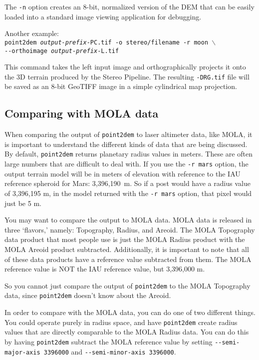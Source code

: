 The {\tt -n} option creates an 8-bit, normalized version of the DEM
that can be easily loaded into a standard image viewing application
for debugging.

Another example: \\
\hspace*{2em}\texttt{point2dem \textit{output-prefix}-PC.tif -o stereo/filename -r moon $\backslash$} \\
\hspace*{4em}\texttt{-\/-orthoimage \textit{output-prefix}-L.tif}

This command takes the left input image and orthographically projects
it onto the 3D terrain produced by the Stereo Pipeline.  The resulting
{\tt *-DRG.tif} file will be saved as an 8-bit GeoTIFF image in a
simple cylindrical map projection.

\subsection{Comparing with MOLA data}

When comparing the output of \texttt{point2dem} to laser altimeter
data, like MOLA, it is important to understand the different kinds
of data that are being discussed.  By default, \texttt{point2dem}
returns planetary radius values in meters.  These are often large
numbers that are difficult to deal with.  If you use the \texttt{-r
mars} option, the output terrain model will be in meters of elevation
with reference to the IAU reference spheroid for Mars: 3,396,190~m.
So if a post would have a radius value of 3,396,195 m, in the model
returned with the \texttt{-r mars} option, that pixel would just be 5 m.

You may want to compare the output to MOLA data.  MOLA data is
released in three `flavors,' namely: Topography, Radius, and Areoid.
The MOLA Topography data product that most people use is just the MOLA Radius
product with the MOLA Areoid product subtracted.  Additionally, it is
important to note that all of these data products have a reference
value subtracted from them.  The MOLA reference value is NOT the
IAU reference value, but 3,396,000 m.

So you cannot just compare the output of \texttt{point2dem}
to the MOLA Topography data, since \texttt{point2dem} doesn't know about the Areoid.

In order to compare with the MOLA data, you can do one of two
different things.  You could operate purely in radius space, and
have \texttt{point2dem} create radius values that are directly
comparable to the MOLA Radius data.  You can do this by having
\texttt{point2dem} subtract the MOLA reference value by setting
\texttt{-\/-semi-major-axis 3396000} and \texttt{-\/-semi-minor-axis
3396000}.

